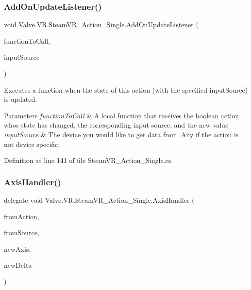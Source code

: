 \subsubsection{\texorpdfstring{AddOnUpdateListener()}{AddOnUpdateListener()}}
{\footnotesize\ttfamily void Valve.\+V\+R.\+Steam\+V\+R\+\_\+\+Action\+\_\+\+Single.\+Add\+On\+Update\+Listener (\begin{DoxyParamCaption}\item[{\mbox{\hyperlink{class_valve_1_1_v_r_1_1_steam_v_r___action___single_a1514666eabcafba498274e8d6cee2a40}{Update\+Handler}}}]{function\+To\+Call,  }\item[{\mbox{\hyperlink{namespace_valve_1_1_v_r_a82e5bf501cc3aa155444ee3f0662853f}{Steam\+V\+R\+\_\+\+Input\+\_\+\+Sources}}}]{input\+Source }\end{DoxyParamCaption})}



Executes a function when the state of this action (with the specified input\+Source) is updated. 


\begin{DoxyParams}{Parameters}
{\em function\+To\+Call} & A local function that receives the boolean action who\textquotesingle{}s state has changed, the corresponding input source, and the new value\\
\hline
{\em input\+Source} & The device you would like to get data from. Any if the action is not device specific.\\
\hline
\end{DoxyParams}


Definition at line 141 of file Steam\+V\+R\+\_\+\+Action\+\_\+\+Single.\+cs.

\mbox{\label{class_valve_1_1_v_r_1_1_steam_v_r___action___single_a4193937cd6b6e4b7248374bc5636f6fd}} 
\subsubsection{\texorpdfstring{AxisHandler()}{AxisHandler()}}
{\footnotesize\ttfamily delegate void Valve.\+V\+R.\+Steam\+V\+R\+\_\+\+Action\+\_\+\+Single.\+Axis\+Handler (\begin{DoxyParamCaption}\item[{\mbox{\hyperlink{class_valve_1_1_v_r_1_1_steam_v_r___action___single}{Steam\+V\+R\+\_\+\+Action\+\_\+\+Single}}}]{from\+Action,  }\item[{\mbox{\hyperlink{namespace_valve_1_1_v_r_a82e5bf501cc3aa155444ee3f0662853f}{Steam\+V\+R\+\_\+\+Input\+\_\+\+Sources}}}]{from\+Source,  }\item[{float}]{new\+Axis,  }\item[{float}]{new\+Delta }\end{DoxyParamCaption})}


